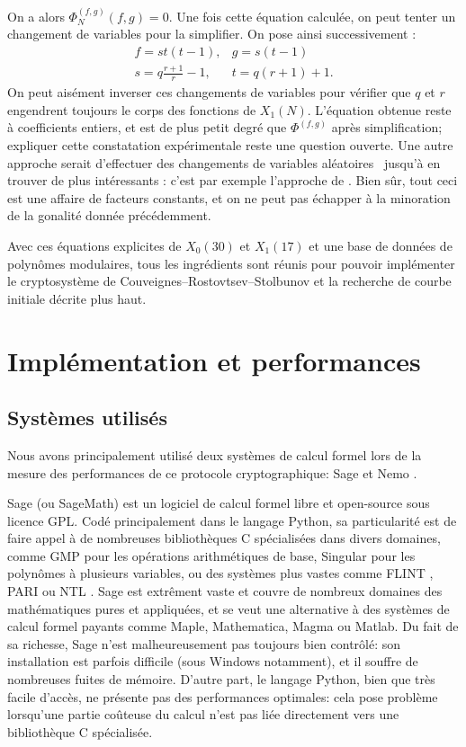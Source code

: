 \documentclass[11pt,a4paper]{article}
\renewcommand{\v}{\vspace{5mm}}
\theoremstyle{definition}
\begin{document}
On a alors $\Phi_N^{(f, g)}(f, g) = 0$. Une fois cette équation calculée, on peut tenter un changement de variables pour la simplifier. On pose ainsi successivement :
$$\begin{matrix} f = st(t-1), & g = s(t-1)\\
 s = q\frac{r+1}{r} - 1, & t = q(r+1) + 1.
 \end{matrix}$$
On peut aisément inverser ces changements de variables pour vérifier que $q$ et $r$ engendrent toujours le corps des fonctions de $X_1(N)$. L'équation obtenue reste à coefficients entiers, et est de plus petit degré que $\Phi^{(f, g)}$ après simplification; expliquer cette constatation expérimentale reste une question ouverte. Une autre approche serait d'effectuer des changements de variables \og aléatoires \fg\ jusqu'à en trouver de plus intéressants : c'est par exemple l'approche de \cite{Sutheq}. Bien sûr, tout ceci est une affaire de facteurs constants, et on ne peut pas échapper à la minoration de la gonalité donnée précédemment.

\v
Avec ces équations explicites de $X_0(30)$ et $X_1(17)$ et une base de données de polynômes modulaires, tous les ingrédients sont réunis pour pouvoir implémenter le cryptosystème de Couveignes--Rostovtsev--Stolbunov et la recherche de courbe initiale décrite plus haut.


\newpage

\section{Implémentation et performances}

\subsection{Systèmes utilisés}

Nous avons principalement utilisé deux systèmes de calcul formel lors de la mesure des performances de ce protocole cryptographique: Sage \cite{Sage} et Nemo \cite{Nemo}.

Sage (ou SageMath) est un logiciel de calcul formel libre et open-source sous licence GPL. Codé principalement dans le langage Python, sa particularité est de faire appel à de nombreuses bibliothèques C spécialisées dans divers domaines, comme GMP \cite{GMP} pour les opérations arithmétiques de base, Singular pour les polynômes à plusieurs variables, ou des systèmes plus vastes comme FLINT \cite{FLINT}, PARI \cite{PARI} ou NTL \cite{NTL}. Sage est extrêment vaste et couvre de nombreux domaines des mathématiques pures et appliquées, et se veut une alternative à des systèmes de calcul formel payants comme Maple, Mathematica, Magma ou Matlab. Du fait de sa richesse, Sage n'est malheureusement pas toujours bien contrôlé: son installation est parfois difficile (sous Windows notamment), et il souffre de nombreuses fuites de mémoire. D'autre part, le langage Python, bien que très facile d'accès, ne présente pas des performances optimales: cela pose problème lorsqu'une partie coûteuse du calcul n'est pas liée directement vers une bibliothèque C spécialisée.
\end{document}
